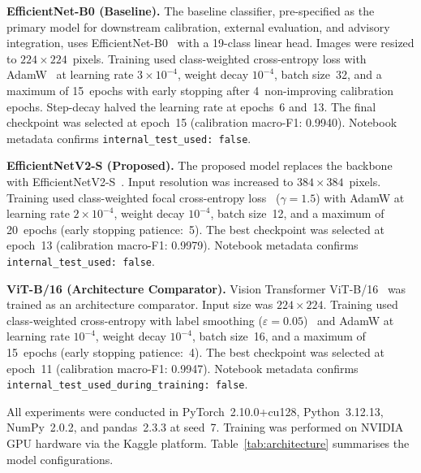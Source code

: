 \documentclass[conference]{IEEEtran}
\begin{document}
\textbf{EfficientNet-B0 (Baseline).}
The baseline classifier, pre-specified as the primary model for
downstream calibration, external evaluation, and advisory integration,
uses EfficientNet-B0~\cite{tan2019efficientnet} with a 19-class
linear head. Images were resized to $224\times224$~pixels. Training
used class-weighted cross-entropy loss with
AdamW~\cite{loshchilov2017decoupled} at learning rate
$3\!\times\!10^{-4}$, weight decay $10^{-4}$, batch size~32, and a
maximum of 15~epochs with early stopping after 4~non-improving
calibration epochs. Step-decay halved the learning rate at epochs~6
and~13. The final checkpoint was selected at epoch~15 (calibration
macro-F1: 0.9940). Notebook metadata confirms
\texttt{internal\_test\_used:~false}.

\textbf{EfficientNetV2-S (Proposed).}
The proposed model replaces the backbone with
EfficientNetV2-S~\cite{tan2021efficientnetv2}. Input resolution was
increased to $384\times384$~pixels. Training used class-weighted focal
cross-entropy loss~\cite{lin2017focal} ($\gamma\!=\!1.5$) with AdamW
at learning rate $2\!\times\!10^{-4}$, weight decay $10^{-4}$, batch
size~12, and a maximum of 20~epochs (early stopping patience:~5). The
best checkpoint was selected at epoch~13 (calibration macro-F1:
0.9979). Notebook metadata confirms
\texttt{internal\_test\_used:~false}.

\textbf{ViT-B/16 (Architecture Comparator).}
Vision Transformer ViT-B/16~\cite{dosovitskiy2021image} was trained as
an architecture comparator. Input size was $224\times224$. Training
used class-weighted cross-entropy with label smoothing
($\varepsilon\!=\!0.05$)~\cite{szegedy2016rethinking} and AdamW at
learning rate $10^{-4}$, weight decay $10^{-4}$, batch size~16, and a
maximum of 15~epochs (early stopping patience:~4). The best checkpoint
was selected at epoch~11 (calibration macro-F1: 0.9947). Notebook
metadata confirms
\texttt{internal\_test\_used\_during\_training:~false}.

All experiments were conducted in PyTorch~2.10.0+cu128,
Python~3.12.13, NumPy~2.0.2, and pandas~2.3.3 at seed~7. Training was
performed on NVIDIA GPU hardware via the Kaggle platform.
Table~\ref{tab:architecture} summarises the model configurations.
\end{document}
